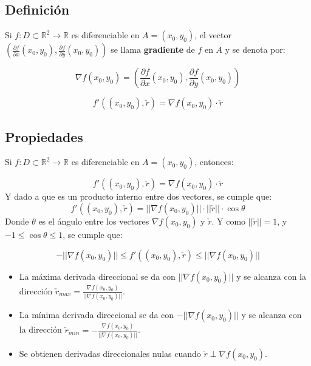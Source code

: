 \subsection*{Definición}
Si $f:D \subset \mathbb{R}^2 \to \mathbb{R}$ es diferenciable en $A=(x_0, y_0)$,
el vector $(\frac{\partial f}{\partial x} (x_0, y_0), \frac{\partial f}{\partial y} (x_0, y_0))$
se llama \textbf{gradiente} de $f$ en $A$ y se denota por:

$$\nabla f (x_0, y_0) =
(\frac{\partial f}{\partial x} (x_0, y_0), \frac{\partial f}{\partial y} (x_0, y_0))
$$

$$
f'((x_0, y_0), \check{r}) = 
\nabla f (x_0, y_0) \cdot \check{r}
$$

\subsection*{Propiedades}
Si $f:D \subset \mathbb{R}^2 \to \mathbb{R}$ es diferenciable en $A=(x_0, y_0)$,
entonces:

$$
f'((x_0, y_0), \check{r}) = 
\nabla f (x_0, y_0) \cdot \check{r}
$$
Y dado a que es un producto interno entre dos vectores, se cumple que:
$$
f'((x_0, y_0), \check{r}) =
||\nabla f (x_0, y_0)|| \cdot ||\check{r}|| \cdot \cos \theta
$$
Donde $\theta$ es el ángulo entre los vectores $\nabla f (x_0, y_0)$ y $\check{r}$.
Y como $||\check{r}|| = 1$, y $-1 \leq \cos \theta \leq 1$, se cumple que:

$$
-||\nabla f (x_0, y_0)|| \leq f'((x_0, y_0), \check{r}) \leq ||\nabla f (x_0, y_0)||
$$ 


\begin{itemize}
    \item La máxima derivada direccional se da con $||\nabla f (x_0, y_0)||$ y se alcanza con la dirección 
    $\check{r}_{max} = \frac{\nabla f (x_0, y_0)}{||\nabla f (x_0, y_0)||}$.
    \item La mínima derivada direccional se da con $-||\nabla f (x_0, y_0)||$ y se alcanza con la dirección 
    $\check{r}_{min} = -\frac{\nabla f (x_0, y_0)}{||\nabla f (x_0, y_0)||}$.
    \item Se obtienen derivadas direccionales nulas cuando $\check{r} \perp \nabla f (x_0, y_0)$.
\end{itemize}